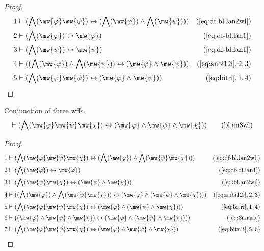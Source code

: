 \begin{proof}
\begin{align}
  1 & \vdash ( \bigwedge( \mw{\varphi} \mw{\psi} ) \leftrightarrow ( \bigwedge(  \mw{\varphi} ) \wedge \bigwedge( \mw{\psi} ) )  )&(\mbox{\ref{eq:df-bl.lan2wl}})\notag
  \\ 2 & \vdash ( \bigwedge( \mw{\varphi} ) \leftrightarrow \mw{\varphi}  )&(\mbox{\ref{eq:df-bl.lan1}})\notag
  \\ 3 & \vdash ( \bigwedge( \mw{\psi} ) \leftrightarrow \mw{\psi} )&(\mbox{\ref{eq:df-bl.lan1}})\notag
  \\ 4 & \vdash ( ( \bigwedge( \mw{\varphi} ) \wedge \bigwedge( \mw{\psi} ) ) \leftrightarrow ( \mw{\varphi} \wedge \mw{\psi} )  )&(\mbox{\ref{eq:anbi12i}},2,3)\notag
  \\ 5 & \vdash ( \bigwedge( \mw{\varphi} \mw{\psi} ) \leftrightarrow ( \mw{\varphi} \wedge \mw{\psi} ) )&(\mbox{\ref{eq:bitri}},1,4)\notag
\end{align}
\end{proof}


\begin{lemma} Conjunction of three wffs.
\begin{align}
\vdash ( \bigwedge( \mw{\varphi} \mw{\psi} \mw{\chi} ) \leftrightarrow ( \mw{\varphi} \wedge \mw{\psi}
    \wedge \mw{\chi} ) )\label{eq:bl.an3wl}\tag{bl.an3wl}
\end{align}
\end{lemma}

\begin{proof}
\begin{align}
  1 & \vdash ( \bigwedge( \mw{\varphi} \mw{\psi} \mw{\chi} ) \leftrightarrow ( \bigwedge(  \mw{\varphi} ) \wedge \bigwedge( \mw{\psi} \mw{\chi} ) )
   )&(\mbox{\ref{eq:df-bl.lan2wl}})\notag
  \\ 2 & \vdash ( \bigwedge( \mw{\varphi} ) \leftrightarrow \mw{\varphi}
    )&(\mbox{\ref{eq:df-bl.lan1}})\notag
  \\ 3 & \vdash ( \bigwedge( \mw{\psi} \mw{\chi} ) \leftrightarrow ( \mw{\psi} \wedge \mw{\chi}
    ) )&(\mbox{\ref{eq:bl.an2wl}})\notag
  \\ 4 & \vdash ( ( \bigwedge( \mw{\varphi} ) \wedge \bigwedge( \mw{\psi} \mw{\chi} ) )
    \leftrightarrow ( \mw{\varphi} \wedge ( \mw{\psi} \wedge \mw{\chi} )
    ) )&(\mbox{\ref{eq:anbi12i}},2,3)\notag
  \\ 5 & \vdash ( \bigwedge( \mw{\varphi} \mw{\psi} \mw{\chi} ) \leftrightarrow ( \mw{\varphi}
    \wedge ( \mw{\psi} \wedge \mw{\chi} ) )
    )&(\mbox{\ref{eq:bitri}},1,4)\notag
  \\ 6 & \vdash ( ( \mw{\varphi} \wedge \mw{\psi} \wedge \mw{\chi} ) \leftrightarrow (
    \mw{\varphi} \wedge ( \mw{\psi} \wedge \mw{\chi} ) )
    )&(\mbox{\ref{eq:3anass}})\notag
  \\ 7 & \vdash ( \bigwedge( \mw{\varphi} \mw{\psi} \mw{\chi} ) \leftrightarrow ( \mw{\varphi}
    \wedge \mw{\psi} \wedge \mw{\chi} )
    )&(\mbox{\ref{eq:bitr4i}},5,6)\notag
\end{align}
\end{proof}

